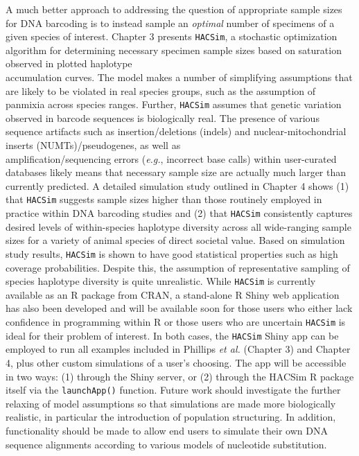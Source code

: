 A much better approach to addressing the question of appropriate sample sizes for DNA barcoding is to instead sample an \textit{optimal} number of specimens of a given species of interest. Chapter 3 presents {\tt HACSim}, a stochastic optimization algorithm for determining necessary specimen sample sizes based on saturation observed in plotted haplotype \\ accumulation curves. The model makes a number of simplifying assumptions that are likely to be violated in real species groups, such as the assumption of panmixia across species ranges. Further, {\tt HACSim} assumes that genetic variation observed in barcode sequences is biologically real. The presence of various sequence artifacts such as insertion/deletions (indels) and nuclear-mitochondrial inserts (NUMTs)/pseudogenes, as well as \\ amplification/sequencing errors (\textit{e.g.}, incorrect base calls) within user-curated databases likely means that necessary sample size are actually much larger than currently predicted.  A detailed simulation study outlined in Chapter 4 shows (1) that {\tt HACSim} suggests sample sizes higher than those routinely employed in practice within DNA barcoding studies and (2) that {\tt HACSim} consistently captures desired levels of within-species haplotype diversity across all wide-ranging sample sizes for a variety of animal species of direct societal value. Based on simulation study results, {\tt HACSim} is shown to have good statistical properties such as high coverage probabilities. Despite this, the assumption of representative sampling of species haplotype diversity is quite unrealistic. While {\tt HACSim} is currently available as an R package from CRAN, a stand-alone R Shiny web application has also been developed and will be available soon for those users who either lack confidence in programming within R or those users who are uncertain {\tt HACSim} is ideal for their problem of interest. In both cases, the {\tt HACSim} Shiny app can be employed to run all examples included in Phillips \textit{et al.} \cite{phillips2020hacsim} (Chapter 3) and Chapter 4, plus other custom simulations of a user's choosing. The app will be accessible in two ways: (1) through the Shiny server, or (2) through the HACSim R package itself via the {\tt launchApp()} function. Future work should investigate the further relaxing of model assumptions so that simulations are made more biologically realistic, in particular the introduction of population structuring. In addition, functionality should be made to allow end users to simulate their own DNA sequence alignments according to various models of nucleotide substitution.

